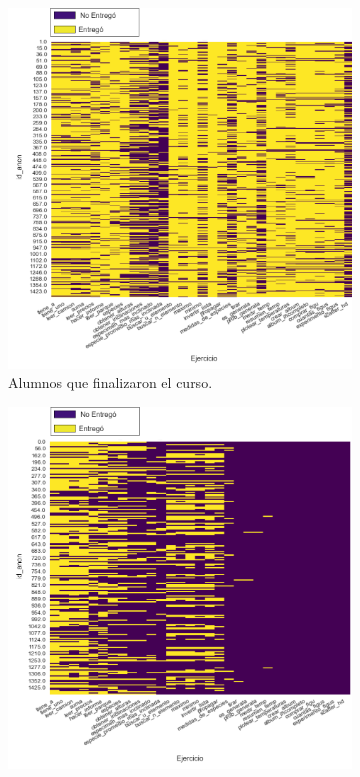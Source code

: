 \documentclass[11pt,a4paper,twoside,openany]{tesis}
\begin{document}
\begin{figure}[H]
    \centering
    \begin{subfigure}[t]{0.3\textwidth}
        \centering
        \includegraphics[width=\linewidth]{imagenes/entregas - finalizados.png}
        \caption{Alumnos que finalizaron el curso.}
        \label{fig:final}
    \end{subfigure}
    \hfill
    \begin{subfigure}[t]{0.3\textwidth}
        \centering
        \includegraphics[width=\linewidth]{imagenes/entregas - clique13.png}

\end{subfigure}
\end{figure}
\end{document}
